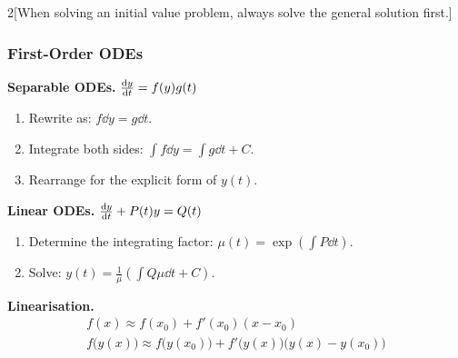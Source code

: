\documentclass{article}
\date{}
\begin{document}
\begin{multicols}{2}[When solving an initial value problem, always solve the general solution first.]
    \subsubsection*{First-Order ODEs}
    \noindent \textbf{Separable ODEs.} $\dv{y}{t} = f(y)g(t)$
    \begin{enumerate}[itemsep=1pt, parsep=1pt]
        \item Rewrite as: $f\dd{y} = g\dd{t}$.
        \item Integrate both sides: $\int f\dd{y} = \int g\dd{t} + C$.
        \item Rearrange for the explicit form of $y(t)$.
    \end{enumerate}
    \noindent \textbf{Linear ODEs.} $\dv{y}{t} + P(t)y = Q(t)$
    \begin{enumerate}[itemsep=1pt, parsep=1pt]
        \item Determine the integrating factor: $\mu(t)=\exp{\left( \int P \dd{t} \right)}$.
        \item Solve: $y(t)=\frac{1}{\mu}\left(\int Q \mu \dd{t} + C\right)$.
    \end{enumerate}
    \noindent \textbf{Linearisation.}
    \begin{gather*}
        f(x) \approx f(x_0) + f'(x_0)(x-x_0) \\
        f\bigl(y(x)\bigr) \approx f\bigl(y(x_0)\bigr) + f'\bigl(y(x)\bigr)\bigl(y(x)-y(x_0)\bigr)
    \end{gather*}

\end{multicols}
\end{document}
